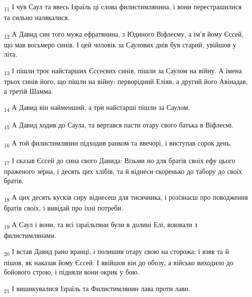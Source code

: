 \begin{tcolorbox}
\textsubscript{11} І чув Саул та ввесь Ізраїль ці слова филистимлянина, і вони перестрашилися та сильно налякалися.
\end{tcolorbox}
\begin{tcolorbox}
\textsubscript{12} А Давид син того мужа ефратянина, з Юдиного Віфлеєму, а ім'я йому Єссей, що мав восьмеро синів. І цей чоловік за Саулових днів був старий, увійшов у літа.
\end{tcolorbox}
\begin{tcolorbox}
\textsubscript{13} І пішли троє найстарших Єссеєвих синів, пішли за Саулом на війну. А імена трьох синів його, що пішли на війну: перворідний Еліяв, а другий його Авінадав, а третій Шамма.
\end{tcolorbox}
\begin{tcolorbox}
\textsubscript{14} А Давид він найменший, а три найстарші пішли за Саулом.
\end{tcolorbox}
\begin{tcolorbox}
\textsubscript{15} А Давид ходив до Саула, та вертався пасти отару свого батька в Віфлеємі.
\end{tcolorbox}
\begin{tcolorbox}
\textsubscript{16} А той филистимлянин підходив ранком та ввечорі, і виступав сорок день.
\end{tcolorbox}
\begin{tcolorbox}
\textsubscript{17} І сказав Єссей до сина свого Давида: Візьми но для братів своїх ефу цього праженого зерна, і десять цих хлібів, та й віднеси скоренько до табору до своїх братів.
\end{tcolorbox}
\begin{tcolorbox}
\textsubscript{18} А цих десять кусків сиру віднесеш для тисячника, і розізнаєш про поводження братів своїх, і вивідай про їхні потреби.
\end{tcolorbox}
\begin{tcolorbox}
\textsubscript{19} А Саул і вони, та всі ізраїльтяни були в долині Елі, воювали з филистимлянами.
\end{tcolorbox}
\begin{tcolorbox}
\textsubscript{20} І встав Давид рано вранці, і полишив отару свою на сторожа; і взяв та й пішов, як наказав йому Єссей. І ввійшов він до обозу, а військо виходило до бойового строю, і підняли вони окрик у бою.
\end{tcolorbox}
\begin{tcolorbox}
\textsubscript{21} І вишикувалися Ізраїль та Филистимлянин лава проти лави.
\end{tcolorbox}
